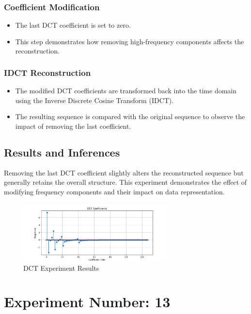 \documentclass[12pt,a4paper]{article}
\begin{document}
\subsubsection{Coefficient Modification}
\begin{itemize}
  \item The last DCT coefficient is set to zero.
  \item This step demonstrates how removing high-frequency components affects the reconstruction.
\end{itemize}

\subsubsection{IDCT Reconstruction}
\begin{itemize}
  \item The modified DCT coefficients are transformed back into the time domain using the Inverse Discrete Cosine Transform (IDCT).
  \item The resulting sequence is compared with the original sequence to observe the impact of removing the last coefficient.
\end{itemize}

\subsection{Results and Inferences}
Removing the last DCT coefficient slightly alters the reconstructed sequence but generally retains the overall structure. This experiment demonstrates the effect of modifying frequency components and their impact on data representation.

\begin{figure}[H]
  \centering
  \includegraphics[width=0.7\textwidth]{dct/dct_coefficients.png}
  \caption{DCT Experiment Results}
  \label{fig:finddct}
\end{figure}

\newpage
\section*{Experiment Number: 13}
\end{document}
